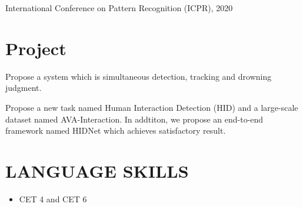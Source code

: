\documentclass{resume}
\begin{document}
International Conference on Pattern Recognition (ICPR), 2020     




\section{Project}
Propose a system which is simultaneous detection, tracking and drowning judgment. 

Propose a new task named Human Interaction Detection (HID) and a large-scale dataset named AVA-Interaction. In addtiton, we propose an end-to-end framework named HIDNet which achieves satisfactory result. 

\section{LANGUAGE SKILLS}
\begin{itemize}
  \item CET 4 and CET 6
\end{itemize}


%
%
\end{document}
